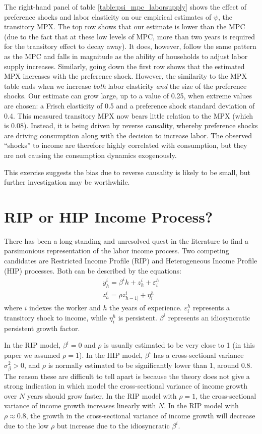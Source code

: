 \documentclass[titlepage]{\econtex}\newcommand{\texname}{ConsumptionHeterogeneity}
\begin{document}
The right-hand panel of table \ref{table:psi_mpc_laborsupply} shows the effect of preference shocks and labor elasticity on our empirical estimates of $\psi$, the transitory MPX. The top row shows that our estimate is lower than the MPC (due to the fact that at these low levels of MPC, more than two years is required for the transitory effect to decay away). It does, however, follow the same pattern as the MPC and falls in magnitude as the ability of households to adjust labor supply increases. Similarly, going down the first row shows that the estimated MPX increases with the preference shock. However, the similarity to the MPX table ends when we increase \textit{both} labor elasticity \textit{and} the size of the preference shocks. Our estimate can grow large, up to a value of 0.25, when extreme values are chosen: a Frisch elasticity of 0.5 and a preference shock standard deviation of 0.4. This measured transitory MPX now bears little relation to the MPX (which is 0.08). Instead, it is being driven by reverse causality, whereby preference shocks are driving consumption along with the decision to increase labor. The observed ``shocks'' to income are therefore highly correlated with consumption, but they are not causing the consumption dynamics exogenously.

This exercise suggests the bias due to reverse causality is likely to be small, but further investigation may be worthwhile.

\section{RIP or HIP Income Process?} \label{rip_hip_appendix}
\setcounter{figure}{0}   
\setcounter{table}{0} 
There has been a long-standing and unresolved quest in the literature to find a parsimonious representation of the labor income process. Two competing candidates are Restricted Income Profile (RIP) and Heterogeneous Income Profile (HIP) processes. Both can be described by the equations:
\begin{align*}
	y_h^i = \beta^i h + z^i_h + \varepsilon^h_i\\
	z^i_h = \rho z^i_{h-1]} + \eta^h_i
\end{align*}
where $i$ indexes the worker and $h$ the years of experience. $\varepsilon^h_i$ represents a transitory shock to income, while $\eta^h_i$ is persistent. $\beta^i$ represents an idiosyncratic persistent growth factor.

In the RIP model, $\beta^i=0$ and $\rho$ is usually estimated to be very close to 1 (in this paper we assumed $\rho=1$). In the HIP model, $\beta^i$ has a cross-sectional variance $\sigma_{\beta}^2>0$, and $\rho$ is normally estimated to be significantly lower than 1, around 0.8. The reason these are difficult to tell apart is because the theory does not give a strong indication in which model the cross-sectional variance of income growth over $N$ years should grow faster. In the RIP model with $\rho=1$, the cross-sectional variance of income growth increases linearly with $N$. In the RIP model with $\rho\approx 0.8$, the growth in the  cross-sectional variance of income growth will decrease due to the low $\rho$ but increase due to the idiosyncratic $\beta^i$.
\end{document}
